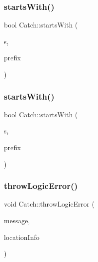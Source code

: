 \subsubsection{\texorpdfstring{starts\+With()}{startsWith()}\hspace{0.1cm}{\footnotesize\ttfamily [1/2]}}
{\footnotesize\ttfamily bool Catch\+::starts\+With (\begin{DoxyParamCaption}\item[{std\+::string const \&}]{s,  }\item[{std\+::string const \&}]{prefix }\end{DoxyParamCaption})}

\mbox{\label{namespace_catch_acad23751846ac23d0f379e34f5adebb1}} 
\subsubsection{\texorpdfstring{starts\+With()}{startsWith()}\hspace{0.1cm}{\footnotesize\ttfamily [2/2]}}
{\footnotesize\ttfamily bool Catch\+::starts\+With (\begin{DoxyParamCaption}\item[{std\+::string const \&}]{s,  }\item[{char}]{prefix }\end{DoxyParamCaption})}

\mbox{\label{namespace_catch_a702b612f683d154c466ea8297ed4a20d}} 
\subsubsection{\texorpdfstring{throw\+Logic\+Error()}{throwLogicError()}}
{\footnotesize\ttfamily void Catch\+::throw\+Logic\+Error (\begin{DoxyParamCaption}\item[{std\+::string const \&}]{message,  }\item[{\mbox{\hyperlink{struct_catch_1_1_source_line_info}{Source\+Line\+Info}} const \&}]{location\+Info }\end{DoxyParamCaption})}

\mbox{\label{namespace_catch_ac036a17412d318598ffda8e1fe7a1177}} 
